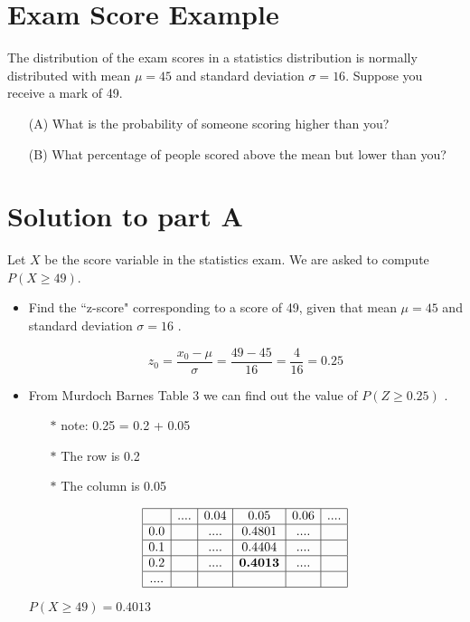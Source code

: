 

	\section*{Exam Score Example}
	The distribution of the exam scores in a statistics distribution is normally distributed with mean $\mu=45$  and standard deviation 
	$\sigma=16$. Suppose you receive a mark of 49.
	\begin{itemize}
		\item[(A)]
		What is the probability of someone scoring higher than you?
		
		\item[(B)] What percentage of people scored above the mean but lower than you?
	\end{itemize}
		\section*{Solution to part A}
	
	Let $X$ be the score variable in the statistics exam. We are asked to compute $P(X \geq 49)$.
\begin{itemize}	
\item Find the  ``z-score" corresponding to a score of 49, given that mean $\mu=45$ and standard deviation  $\sigma=16$ .
	
	\[ z_0  = \frac{x_0-\mu}{\sigma}   = \frac{49-45}{16}  = \frac{4}{16} =0.25\]
	
\item From Murdoch Barnes Table 3 we can find out the value of $P(Z \geq 0.25)$  . 
	
	
	
	\begin{itemize}
	\item[$\ast$] note: 0.25 = 0.2 + 0.05
	\item[$\ast$] The row is 0.2
	\item[$\ast$] The column is 0.05
	\end{itemize}
	\[
	\begin{array}{|c|c|c|c|c|c|c|}\hline
	& ....	& 0.04	& 0.05	 & 0.06	& .... \\ \hline
	0.0	&	& ....	& 0.4801 & ....	& 	\\ \hline
	0.1	&	& ....	& 0.4404 & ....& 	\\ \hline
	0.2	&	& ....	& \textbf{0.4013} & ....	& 	\\ \hline
	....	&	&	&	 & 	&	\\ \hline
	
	\end{array} \]
	
$P(X \geq 49)  = 0.4013$
\end{itemize}
	
